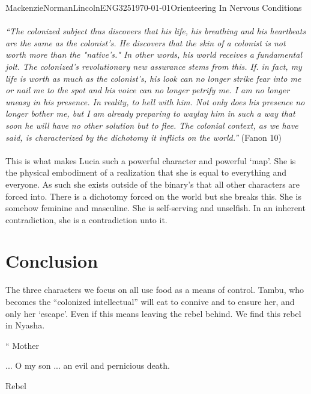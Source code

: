 \documentclass{article}
\begin{document}
\begin{mla}{Mackenzie}{Norman}{Lincoln}{ENG325}{\today}{Orienteering In Nervous Conditions}
\paragraph{}
\textit {``The colonized subject thus discovers that his life, his breathing and his heartbeats are the same as the colonist's. He discovers that the skin of a colonist is not worth more than the "native's." In other words, his world receives a fundamental jolt. The colonized's revolutionary new assurance stems from this. If. in fact, my life is worth as much as the colonist's, his look can no longer strike fear into me or nail me to the spot and his voice can no longer petrify me. I am no longer uneasy in his presence. In reality, to hell with him. Not only does his presence no longer bother me, but I am already preparing to waylay him in such a way that soon he will have no other solution but to flee. The colonial context, as we have said, is characterized by the dichotomy it inflicts on the world.''} (Fanon 10)
\paragraph{}
This is what makes Lucia such a powerful character and powerful `map'. She is the physical embodiment of a realization that she is equal to everything and everyone. As such she exists outside of the binary's that all other characters are forced into. There is a dichotomy forced on the world but she breaks this.  She is somehow feminine and masculine. She is self-serving and unselfish. In an inherent contradiction, she is a contradiction unto it. 




\section*{Conclusion}
The three characters we focus on all use food as a means of control. Tambu, who becomes the ``colonized intellectual'' will eat to connive and to ensure her, and only her `escape'. Even if this means leaving the rebel behind. We find this rebel in Nyasha.  

\begin{center}
``
   Mother 

   ... O my son ... an evil and pernicious death.

   Rebel


\end{center}
\end{mla}
\end{document}
